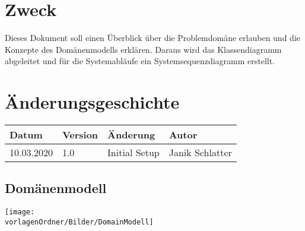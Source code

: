 \documentclass[
	ngerman,
	toc=listof, %
	toc=bibliography, %
	footnotes=multiple, %
	parskip=half, %
	numbers=noendperiod %
]{scrartcl}
\newcommand{\vorlagenOrdner}{../../99_Vorlagen} %
\begin{document}
\thispagestyle{plain}

\cleardoublepage


\section*{Zweck}
Dieses Dokument soll einen Überblick über die Problemdomäne erlauben und die Konzepte des Domänenmodells erklären.
Daraus wird das Klassendiagramm abgeleitet und für die Systemabläufe ein Systemsequenzdiagramm erstellt.

\section*{Änderungsgeschichte}
\begin{tabularx}{\textwidth}{llXl}
	\toprule
	Datum & Version & Änderung & Autor \\
	\midrule
	10.03.2020 & 1.0 & Initial Setup & Janik Schlatter \\

	\bottomrule
\end{tabularx}
\cleardoublepage

{}
\tableofcontents
\cleardoublepage

\let\stdsection\section
\renewcommand\section{\clearpage\stdsection}

\begin{landscape}
	\section{Domänenmodell}
	\texttt{[image: \\vorlagenOrdner/Bilder/DomainModell]}
	\newpage	
\end{landscape}
\end{document}
